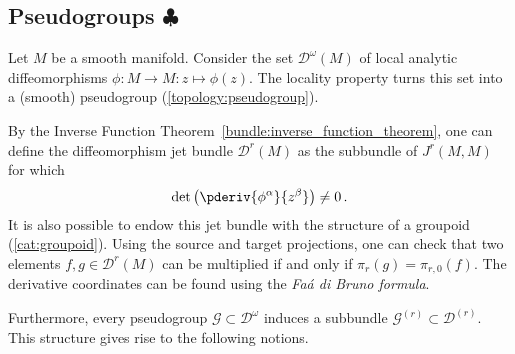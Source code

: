 \subsection{\texorpdfstring{Pseudogroups $\clubsuit$}{Pseudogroups}}

    \begin{example}
        Let $M$ be a smooth manifold. Consider the set $\mathcal{D}^\omega(M)$ of local analytic diffeomorphisms $\phi:M\rightarrow M:z\mapsto\phi(z)$. The locality property turns this set into a (smooth) pseudogroup (\cref{topology:pseudogroup}).

        By the Inverse Function Theorem~\ref{bundle:inverse_function_theorem}, one can define the diffeomorphism jet bundle $\mathcal{D}^r(M)$ as the subbundle of $J^r(M,M)$ for which \[\det\left(\pderiv{\phi^\alpha}{z^\beta}\right)\neq0\,.\] It is also possible to endow this jet bundle with the structure of a groupoid (\cref{cat:groupoid}). Using the source and target projections, one can check that two elements $f,g\in\mathcal{D}^r(M)$ can be multiplied if and only if $\pi_r(g)=\pi_{r,0}(f)$. The derivative coordinates can be found using the \textit{Fa\'a di Bruno formula}.
    \end{example}
    Furthermore, every pseudogroup $\mathcal{G}\subset\mathcal{D}^\omega$ induces a subbundle $\mathcal{G}^{(r)}\subset\mathcal{D}^{(r)}$. This structure gives rise to the following notions.
